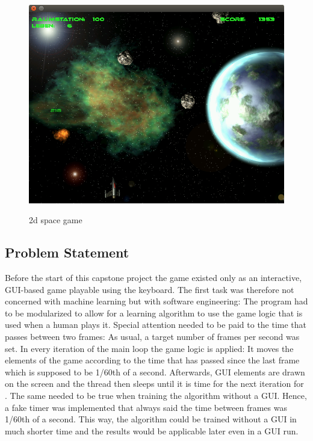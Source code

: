 \documentclass[a4paper,10pt]{article}
\begin{document}
\begin{figure}
 \centering
 \includegraphics[width=\linewidth]{game3.png}
 \label{fig:game}
 \caption{2d space game}
\end{figure}

\subsection{Problem Statement}

Before the start of this capstone project the game existed only as an interactive, GUI-based game playable using the keyboard. 
The first task was therefore not concerned with machine learning but with software engineering:
The program had to be modularized to allow for a learning algorithm to use the game logic that is used when a human plays it.
Special attention needed to be paid to the time that passes between two frames:
As usual, a target number of frames per second was set.
In every iteration of the main loop the game logic is applied: It moves the elements of the game according to the time that has passed since the last frame which is supposed to be 1/60th of a second.
Afterwards, GUI elements are drawn on the screen and the thread then sleeps until it is time for the next iteration for .
The same needed to be true when training the algorithm without a GUI.
Hence, a fake timer was implemented that always said the time between frames was 1/60th of a second.
This way, the algorithm could be trained without a GUI in much shorter time and the results would be applicable later even in a GUI run.
\end{document}

